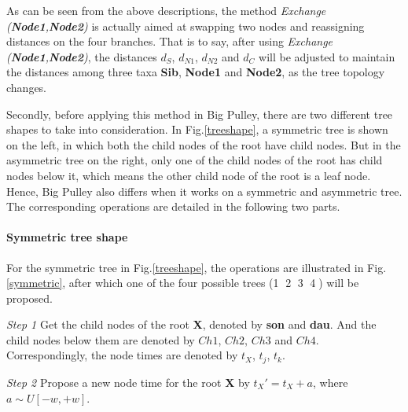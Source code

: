 \documentclass{bmcart}
\begin{document}
As can be seen from the above descriptions, the method \textit{Exchange (\textbf{Node1},\textbf{Node2})} is actually aimed at swapping two nodes and reassigning distances on the four branches. That is to say, after using \textit{Exchange (\textbf{Node1},\textbf{Node2})}, the distances $d_S$, $d_{N1}$, $d_{N2}$ and $d_{C}$ will be adjusted to maintain the distances among three taxa \textbf{Sib}, \textbf{Node1} and \textbf{Node2}, as the tree topology changes. 

Secondly, before applying this method in Big Pulley, there are two different tree shapes to take into consideration. In Fig.\ref{treeshape}, a symmetric tree is shown on the left, in which both the child nodes of the root have child nodes. But in the asymmetric tree on the right, only one of the child nodes of the root has child nodes below it, which means the other child node of the root is a leaf node. Hence, Big Pulley also differs when it works on a symmetric and asymmetric tree. The corresponding operations are detailed in the following two parts.
\paragraph*{Symmetric tree shape}

For the symmetric tree in Fig.\ref{treeshape}, the operations are illustrated in Fig.\ref{symmetric}, after which one of the four possible trees (\textcircled1 \textcircled2 \textcircled3 \textcircled4) will be proposed.

\emph{Step 1} Get the child nodes of the root \textbf{X}, denoted by \textbf{son} and \textbf{dau}. And the child nodes below them are denoted by $Ch1$, $Ch2$, $Ch3$ and $Ch4$. Correspondingly, the node times are denoted by $t_X$, $t_j$, $t_k$.

\emph{Step 2} Propose a new node time for the root \textbf{X} by ${t_X}' = {t_X} + a$, where $a \sim U[ - w, + w]$.
\end{document}
